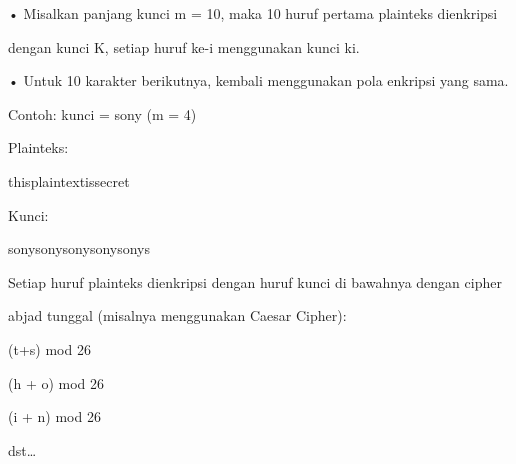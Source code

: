 \documentclass{article}
\begin{document}

• Misalkan panjang kunci m = 10, maka 10 huruf pertama plainteks dienkripsi 

dengan kunci K, setiap huruf ke-i menggunakan kunci ki. 

• Untuk 10 karakter berikutnya, kembali menggunakan pola enkripsi yang sama.

   Contoh: kunci = sony    (m = 4)

 Plainteks: 

thisplaintextissecret

 Kunci: 

sonysonysonysonysonys

   Setiap huruf plainteks dienkripsi dengan huruf kunci di bawahnya dengan  cipher 

abjad tunggal (misalnya menggunakan Caesar Cipher):

                (t+s) mod 26

                  (h + o) mod 26


(i + n) mod 26

                   dst…
\end{document}
